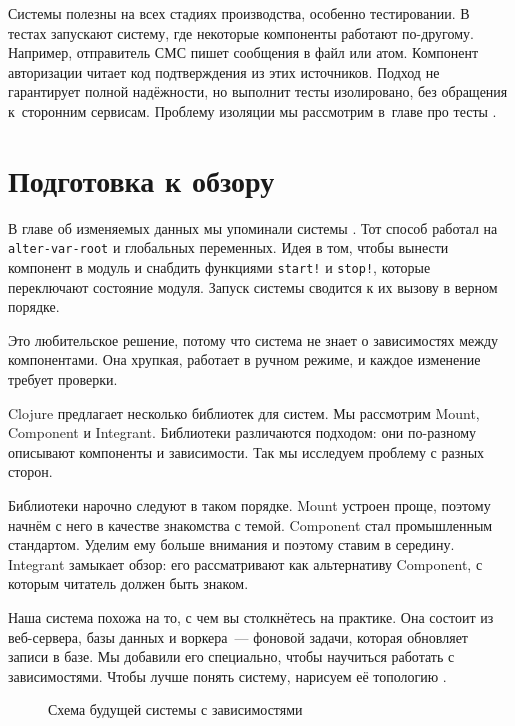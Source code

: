 Системы полезны на всех стадиях производства, особенно тестировании. В тестах
запускают систему, где некоторые компоненты работают по-другому. Например,
отправитель СМС пишет сообщения в файл или атом. Компонент авторизации читает
код подтверждения из этих источников. Подход не гарантирует полной надёжности,
но выполнит тесты изолировано, без обращения к~сторонним сервисам. Проблему
изоляции мы рассмотрим в~главе про тесты .

\section{Подготовка к обзору}


В главе об изменяемых данных мы упоминали системы . Тот
способ работал на \verb|alter-var-root| и глобальных переменных. Идея в том,
чтобы вынести компонент в модуль и снабдить функциями \verb|start!| и
\verb|stop!|, которые переключают состояние модуля. Запуск системы сводится к их
вызову в верном порядке.

Это любительское решение, потому что система не знает о зависимостях между
компонентами. Она хрупкая, работает в ручном режиме, и каждое изменение требует
проверки.

Clojure предлагает несколько библиотек для систем. Мы рассмотрим Mount,
Component и Integrant. Библиотеки различаются подходом: они по-разному описывают
компоненты и зависимости. Так мы исследуем проблему с разных сторон.

Библиотеки нарочно следуют в таком порядке. Mount устроен проще, поэтому начнём
с него в качестве знакомства с темой. Component стал промышленным
стандартом. Уделим ему больше внимания и поэтому ставим в середину. Integrant
замыкает обзор: его рассматривают как альтернативу Component, с которым читатель
должен быть знаком.

Наша система похожа на то, с чем вы столкнётесь на практике. Она состоит из
веб-сервера, базы данных и воркера~--- фоновой задачи, которая обновляет записи
в базе. Мы добавили его специально, чтобы научиться работать с
зависимостями. Чтобы лучше понять систему, нарисуем её топологию .

\label{demo-system}

\begin{figure}[ht!]
  \caption{Схема будущей системы с зависимостями}
  \label{fig:chart-system}
\end{figure}

